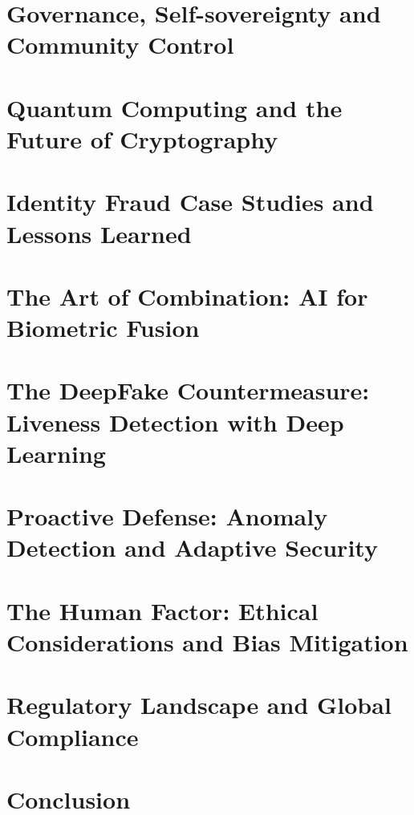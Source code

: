 \documentclass[12pt,a4paper,twoside,openright]{book}
\begin{document}
\chapter{Governance, Self-sovereignty and Community Control}
\chapter{Quantum Computing and the Future of Cryptography}
\chapter{Identity Fraud Case Studies and Lessons Learned}
\chapter{The Art of Combination: AI for Biometric Fusion}
\chapter{The DeepFake Countermeasure: Liveness Detection with Deep Learning}
\chapter{Proactive Defense: Anomaly Detection and Adaptive Security}
\chapter{The Human Factor: Ethical Considerations and Bias Mitigation}
\chapter{Regulatory Landscape and Global Compliance}
\chapter{Conclusion}

\appendix
\clearpage
\printglossaries
\end{document}
